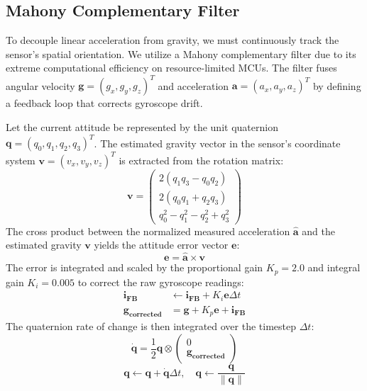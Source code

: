 \documentclass[12pt,a4paper]{article}
\begin{document}
\subsection{Mahony Complementary Filter}
To decouple linear acceleration from gravity, we must continuously track the sensor's spatial orientation. We utilize a Mahony complementary filter due to its extreme computational efficiency on resource-limited MCUs. The filter fuses angular velocity $\mathbf{g} = (g_x, g_y, g_z)^T$ and acceleration $\mathbf{a} = (a_x, a_y, a_z)^T$ by defining a feedback loop that corrects gyroscope drift. 

Let the current attitude be represented by the unit quaternion $\mathbf{q} = (q_0, q_1, q_2, q_3)^T$. The estimated gravity vector in the sensor's coordinate system $\mathbf{v} = (v_x, v_y, v_z)^T$ is extracted from the rotation matrix:
\begin{equation}
    \mathbf{v} = \begin{pmatrix}
        2(q_1 q_3 - q_0 q_2) \\
        2(q_0 q_1 + q_2 q_3) \\
        q_0^2 - q_1^2 - q_2^2 + q_3^2
    \end{pmatrix}
\end{equation}
The cross product between the normalized measured acceleration $\mathbf{\hat{a}}$ and the estimated gravity $\mathbf{v}$ yields the attitude error vector $\mathbf{e}$:
\begin{equation}
    \mathbf{e} = \mathbf{\hat{a}} \times \mathbf{v}
\end{equation}
The error is integrated and scaled by the proportional gain $K_p = 2.0$ and integral gain $K_i = 0.005$ to correct the raw gyroscope readings:
\begin{align}
    \mathbf{i_{FB}} &\leftarrow \mathbf{i_{FB}} + K_i \mathbf{e} \Delta t \\
    \mathbf{g_{corrected}} &= \mathbf{g} + K_p \mathbf{e} + \mathbf{i_{FB}}
\end{align}
The quaternion rate of change is then integrated over the timestep $\Delta t$:
\begin{equation}
    \mathbf{\dot{q}} = \frac{1}{2} \mathbf{q} \otimes \begin{pmatrix} 0 \\ \mathbf{g_{corrected}} \end{pmatrix}
\end{equation}
\begin{equation}
    \mathbf{q} \leftarrow \mathbf{q} + \mathbf{\dot{q}} \Delta t, \quad \mathbf{q} \leftarrow \frac{\mathbf{q}}{\|\mathbf{q}\|}
\end{equation}
\end{document}
